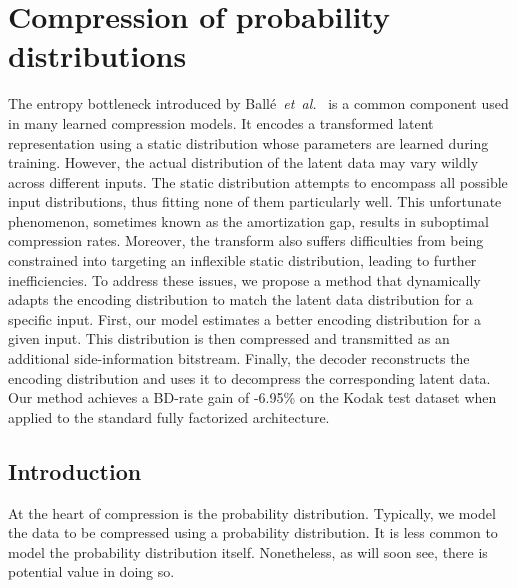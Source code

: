 \chapter{Compression of probability distributions}
\label{ch:pdf_compression}


\begin{chapabstract}
  The entropy bottleneck introduced by Ballé~\emph{et~al.}~\cite{balle2018variational} is a common component used in many learned compression models.
  It encodes a transformed latent representation using a static distribution whose parameters are learned during training.
  However, the actual distribution of the latent data may vary wildly across different inputs.
  The static distribution attempts to encompass all possible input distributions, thus fitting none of them particularly well.
  This unfortunate phenomenon, sometimes known as the amortization gap, results in suboptimal compression rates.
  Moreover, the transform also suffers difficulties from being constrained into targeting an inflexible static distribution, leading to further inefficiencies.
  To address these issues, we propose a method that dynamically adapts the encoding distribution to match the latent data distribution for a specific input.
  First, our model estimates a better encoding distribution for a given input.
  This distribution is then compressed and transmitted as an additional side-information bitstream.
  Finally, the decoder reconstructs the encoding distribution and uses it to decompress the corresponding latent data.
  Our method achieves a BD-rate gain of -6.95\% on the Kodak test dataset when applied to the standard fully factorized architecture.
\end{chapabstract}




\section{Introduction}
\label{sec:pdf_compression/intro}

At the heart of compression is the probability distribution.
Typically, we model the data to be compressed using a probability distribution.
It is less common to model the probability distribution itself.
Nonetheless, as will soon see, there is potential value in doing so.

